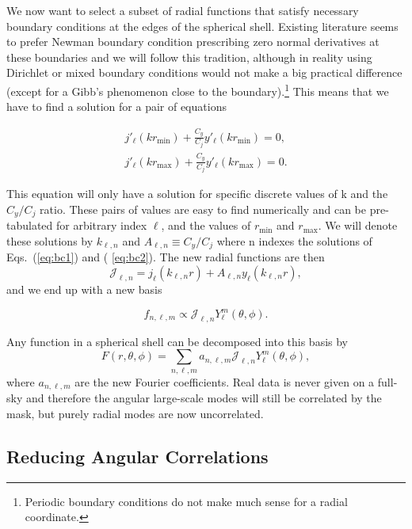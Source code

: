 \documentclass[fleqn,usenatbib]{mnras}
\newcommand{\rmin}{r_\mathrm{min}}
\newcommand{\rmax}{r_\mathrm{max}}
\begin{document}
We now want to select a subset of radial functions that satisfy necessary
boundary conditions at the edges of the spherical shell. Existing literature
seems to prefer Newman boundary condition prescribing zero normal derivatives at
these boundaries and we will follow this tradition, although in reality using
Dirichlet or mixed boundary conditions would not make a big practical difference
(except for a Gibb's phenomenon close to the boundary).\footnote{Periodic
boundary conditions do not make much sense for a radial coordinate.} This means
that we have to find a solution for a pair of equations

\begin{align}
\label{eq:bc1}
j'_\ell(k\rmin) + \frac{C_y}{C_j}y'_\ell(k\rmin) = 0,\\
\label{eq:bc2}
j'_\ell(k\rmax) + \frac{C_y}{C_j}y'_\ell(k\rmax) = 0. 
\end{align} 

\noindent 
This equation will only have a solution for specific discrete values of k and
the $C_y/C_j$ ratio. These pairs of values are easy to find numerically and can
be pre-tabulated for arbitrary index $\ell$, and the values of $\rmin$ and
$\rmax$. We will denote these solutions by $k_{\ell,n}$ and $A_{\ell,n} \equiv
C_y/C_j$ where n indexes the solutions of Eqs.~(\ref{eq:bc1}) and (
\ref{eq:bc2}). The new radial functions are then
\begin{equation} 
\mathcal{J}_{\ell,n} = j_\ell(k_{\ell,n}r) + A_{\ell,n}y_\ell(k_{\ell,n}r),
\end{equation}
\noindent
and we end up with a new basis

\begin{equation}
f_{n,\ell,m} \propto \mathcal{J}_{\ell,n}Y^m_\ell(\theta,\phi).
\end{equation}

Any function in a spherical shell can be decomposed into this basis by
\begin{equation}
F(r,\theta,\phi) = \displaystyle\sum_{n,\ell,m}a_{n,\ell,m}\mathcal{J}_
{\ell,n}Y^m_\ell(\theta,\phi),
\end{equation}
\noindent
where $a_{n,\ell,m}$ are the new Fourier coefficients. Real data is never given
on a full-sky and therefore the angular large-scale modes will still be
correlated by the mask, but purely radial modes are now uncorrelated.

\subsection{Reducing Angular Correlations}
\end{document}
